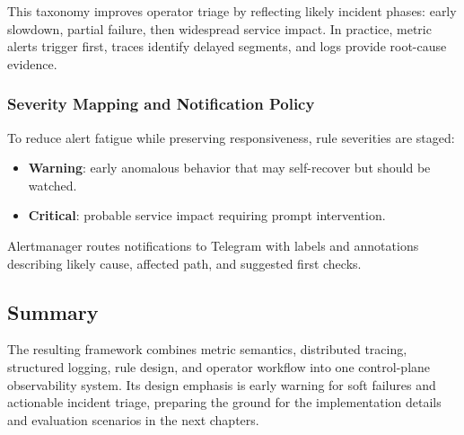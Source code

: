 This taxonomy improves operator triage by reflecting likely incident phases: early slowdown, partial failure, then widespread service impact. In practice, metric alerts trigger first, traces identify delayed segments, and logs provide root-cause evidence.

\subsubsection{Severity Mapping and Notification Policy}

To reduce alert fatigue while preserving responsiveness, rule severities are staged:

\begin{itemize}
	\item \textbf{Warning}: early anomalous behavior that may self-recover but should be watched.
	\item \textbf{Critical}: probable service impact requiring prompt intervention.
\end{itemize}

Alertmanager routes notifications to Telegram with labels and annotations describing likely cause, affected path, and suggested first checks.

\subsection{Summary}

The resulting framework combines metric semantics, distributed tracing, structured logging, rule design, and operator workflow into one control-plane observability system. Its design emphasis is early warning for soft failures and actionable incident triage, preparing the ground for the implementation details and evaluation scenarios in the next chapters.
